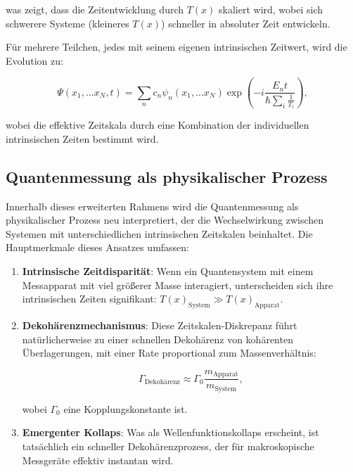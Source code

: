 \documentclass[12pt,a4paper]{article}
\newcommand{\Tfield}{T(x)}
\begin{document}
	was zeigt, dass die Zeitentwicklung durch $\Tfield$ skaliert wird, wobei sich schwerere Systeme (kleineres $\Tfield$) schneller in absoluter Zeit entwickeln.
	
	Für mehrere Teilchen, jedes mit seinem eigenen intrinsischen Zeitwert, wird die Evolution zu:
	
	\begin{equation}
		\Psi(x_1,...x_N,t) = \sum_n c_n \psi_n(x_1,...x_N) \exp\left(-i\frac{E_n t}{\hbar \sum_i \frac{1}{T_i}}\right),
		\label{eq:multi_particle}
	\end{equation}
	
	wobei die effektive Zeitskala durch eine Kombination der individuellen intrinsischen Zeiten bestimmt wird.
	
	\subsection{Quantenmessung als physikalischer Prozess}
	\label{subsec:quantum_measurement}
	
	Innerhalb dieses erweiterten Rahmens wird die Quantenmessung als physikalischer Prozess neu interpretiert, der die Wechselwirkung zwischen Systemen mit unterschiedlichen intrinsischen Zeitskalen beinhaltet. Die Hauptmerkmale dieses Ansatzes umfassen:
	
	\begin{enumerate}
		\item \textbf{Intrinsische Zeitdisparität}: Wenn ein Quantensystem mit einem Messapparat mit viel größerer Masse interagiert, unterscheiden sich ihre intrinsischen Zeiten signifikant: $\Tfield_{\text{System}} \gg \Tfield_{\text{Apparat}}$.
		
		\item \textbf{Dekohärenzmechanismus}: Diese Zeitskalen-Diskrepanz führt natürlicherweise zu einer schnellen Dekohärenz von kohärenten Überlagerungen, mit einer Rate proportional zum Massenverhältnis:
		
		\begin{equation}
			\Gamma_{\text{Dekohärenz}} \approx \Gamma_0 \frac{m_{\text{Apparat}}}{m_{\text{System}}},
			\label{eq:decoherence_rate}
		\end{equation}
		
		wobei $\Gamma_0$ eine Kopplungskonstante ist.
		
		\item \textbf{Emergenter Kollaps}: Was als Wellenfunktionskollaps erscheint, ist tatsächlich ein schneller Dekohärenzprozess, der für makroskopische Messgeräte effektiv instantan wird.
	\end{enumerate}
	
\end{document}
